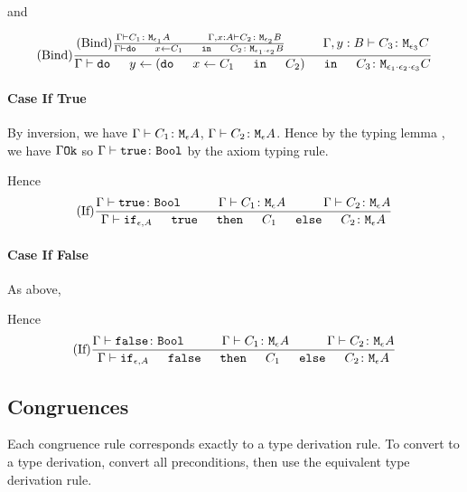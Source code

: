 \documentclass{report}
\begin{document}
        and 

        \begin{equation}
            \treerule{Bind}{
                \treerule{Bind}{
                    \gtyperelation{C_1}{\M{\e_1}{A}}
                    \s\s
                    \typerelation{\gax}{C_2}{\M{\e_2}{B}}
                } {
                    \gtyperelation{\doin{x}{C_1}{C_2}}{\M{\e_1\dot\e_2}{B}}
                }
                \s\s
                \typerelation{\gby}{C_3}{\M{\e_3}{C}}
            }{
                \gtyperelation{\doin{y}{(\doin{x}{C_1}{C_2})}{C_3}}{\M{\e_1\dot\e_2\dot\e_3}{C}}
            }
        \end{equation}

        \paragraph{Case If True}
            By inversion, we have $\Gamma \vdash C_1 \colon \texttt{M}_{\epsilon}{A}$, $\Gamma \vdash C_2 \colon \texttt{M}_{\epsilon}{A}$. Hence by the typing lemma , we have $\Gamma \texttt{Ok}$ so $\Gamma \vdash \texttt{true} \colon \texttt{Bool}$ by the axiom typing rule.

            Hence 
            \begin{equation}
                    \treerule{If}{
                        \gtyperelation{\t}{\B}
                        \s\s
                        \gtyperelation{C_1}{\mea}
                        \s\s
                        \gtyperelation{C_2}{\mea}
                    }{
                        \gtyperelation{\ifthenelse{\e}{A}{\t}{C_1}{C_2}}{\mea}
                    }
            \end{equation}
        \paragraph{Case If False}
        As above,

        Hence 
        \begin{equation}
            \treerule{If}{
                \gtyperelation{\f}{\B}
                \s\s
                \gtyperelation{C_1}{\mea}
                \s\s
                \gtyperelation{C_2}{\mea}
            }{
                \gtyperelation{\ifthenelse{\e}{A}{\f}{C_1}{C_2}}{\mea}
            }
    \end{equation}
        \subsection{Congruences}
    Each congruence rule corresponds exactly to a type derivation rule. To convert to a type derivation, convert all preconditions, then use the equivalent type derivation rule.
\end{document}
